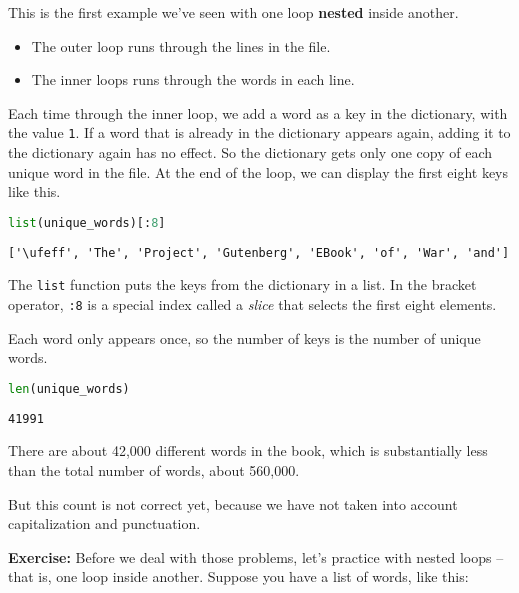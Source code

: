 This is the first example we've seen with one loop \textbf{nested}
inside another.

\begin{itemize}
\item
  The outer loop runs through the lines in the file.
\item
  The inner loops runs through the words in each line.
\end{itemize}

Each time through the inner loop, we add a word as a key in the
dictionary, with the value \passthrough{\lstinline!1!}. If a word that
is already in the dictionary appears again, adding it to the dictionary
again has no effect. So the dictionary gets only one copy of each unique
word in the file. At the end of the loop, we can display the first eight
keys like this.

\begin{lstlisting}[language=Python,style=source]
list(unique_words)[:8]
\end{lstlisting}

\begin{lstlisting}[style=output]
['\ufeff', 'The', 'Project', 'Gutenberg', 'EBook', 'of', 'War', 'and']
\end{lstlisting}

The \passthrough{\lstinline!list!} function puts the keys from the
dictionary in a list. In the bracket operator,
\passthrough{\lstinline!:8!} is a special index called a \emph{slice}
that selects the first eight elements.

Each word only appears once, so the number of keys is the number of
unique words.

\begin{lstlisting}[language=Python,style=source]
len(unique_words)
\end{lstlisting}

\begin{lstlisting}[style=output]
41991
\end{lstlisting}

There are about 42,000 different words in the book, which is
substantially less than the total number of words, about 560,000.

But this count is not correct yet, because we have not taken into
account capitalization and punctuation.

\textbf{Exercise:} Before we deal with those problems, let's practice
with nested loops -- that is, one loop inside another. Suppose you have
a list of words, like this:


